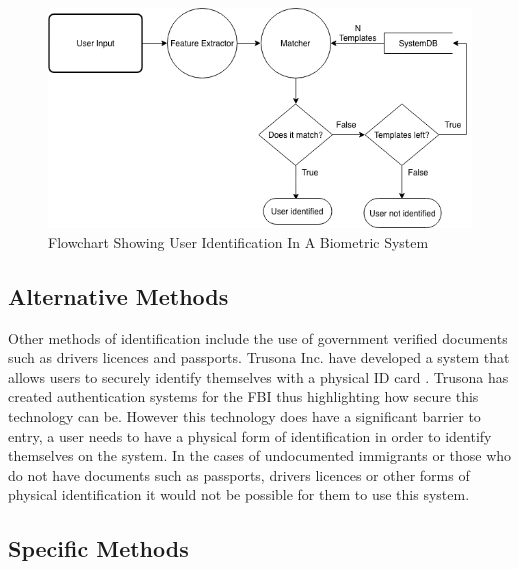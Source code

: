 \documentclass[12pt]{article}
\begin{document}
		\begin{figure}[H]
	    \centering
	    \includegraphics[width=\textwidth]{biometric_flowcharts-Identification.png}
	    \caption{Flowchart Showing User Identification In A Biometric System \citep{jain2004introduction}}
	    \label{fig:flowchat:identification}
	\end{figure}
	
	\subsection{Alternative Methods}
	Other methods of identification include the use of government verified documents such as drivers licences and passports.
	Trusona Inc. have developed a system that allows users to securely identify themselves with a physical ID card \citep{eisen2017systems}. Trusona has created authentication systems for the FBI \citep{abagnale_2017} thus highlighting how secure this technology can be. However this technology does have a significant barrier to entry, a user needs to have a physical form of identification in order to identify themselves on the system. In the cases of undocumented immigrants or those who do not have documents such as passports, drivers licences or other forms of physical identification it would not be possible for them to use this system.
	
	\subsection{Specific Methods}
	\label{subsect:specific_methods}
\end{document}

